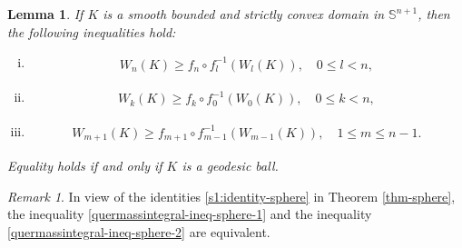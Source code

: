 \documentclass[11pt,reqno]{amsart}
\newtheorem{lem}[thm]{Lemma}
\theoremstyle{definition}
\theoremstyle{remark}
\newtheorem{rem}{Remark}
\numberwithin{equation}{section}
\renewcommand{\(}{\left(}
\renewcommand{\)}{\right)}
\renewcommand{\~}{\tilde}
\renewcommand{\-}{\overline}
\begin{document}
\begin{lem}\label{s5:key-lemma-ineq-I}
	If $K$ is a smooth bounded and strictly convex domain in $\mathbb S^{n+1}$, then the following inequalities hold:
		\begin{enumerate}[(i)]
		\item \cite{BGL19,GL21}
		\begin{align}\label{quermassintegral-ineq-sphere-1}
	    W_n(K)\geq f_n \circ f_l^{-1}(W_l(K)),  \quad 0\leq l<n,
		\end{align}	
		\item \cite{CGLS21,Chen-Sun21}
		\begin{align}\label{quermassintegral-ineq-sphere-2}
		W_k(K) \geq f_k\circ f_0^{-1}(W_0(K)),  \quad 0\leq k<n,
		\end{align}
		\item \cite{Chen-Sun21}
		\begin{align}\label{quermassintegral-ineq-sphere-II}
		W_{m+1}(K) \geq f_{m+1}\circ f_{m-1}^{-1}(W_{m-1}(K)), \quad 1\leq m \leq n-1.
		\end{align}	
		\end{enumerate}
		Equality holds if and only if $K$ is a geodesic ball.
\end{lem}
\begin{rem}
	In view of the identities \eqref{s1:identity-sphere} in Theorem \ref{thm-sphere}, the inequality \eqref{quermassintegral-ineq-sphere-1} and the inequality \eqref{quermassintegral-ineq-sphere-2} are equivalent.
\end{rem}
\end{document}
